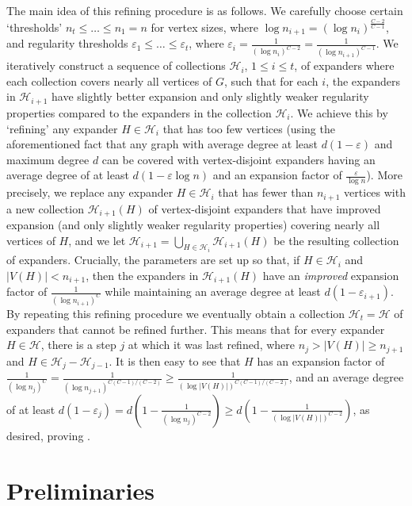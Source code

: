 \documentclass[10pt]{article}
\theoremstyle{plain}
\numberwithin{theorem}{section}
\theoremstyle{definition}
\theoremstyle{remark}
\newcommand{\cH}{\mathcal{H}}
\renewcommand{\setminus}{-}
\newcommand{\eps}{\varepsilon}
\theoremstyle{plain}
\begin{document}
The main idea of this refining procedure is as follows. We carefully choose certain `thresholds' $n_t \leq \dots \leq n_1 = n$ for vertex sizes, where $\log n_{i+1} = (\log n_i)^{\frac{C-2}{C-1}}$, and regularity thresholds $\eps_1 \leq \dots \leq \eps_t$, where $\eps_i = \frac{1}{(\log n_i)^{C-2}} = \frac{1}{(\log n_{i+1})^{C-1}}$. We iteratively construct a sequence of collections $\mathcal{H}_i$, $1 \leq i \leq t$, of expanders where each collection covers nearly all vertices of $G$, such that for each $i$, the expanders in $\mathcal{H}_{i+1}$ have slightly better expansion and only slightly weaker regularity properties compared to the expanders in the collection $\mathcal{H}_i$. We achieve this by `refining' any expander $H \in \mathcal{H}_i$ that has too few vertices (using
the aforementioned fact that any graph with average degree at least $d(1 - \eps)$ and maximum degree $d$ can be covered with vertex-disjoint expanders having an average degree of at least $d(1 - \eps \log n)$ and an expansion factor of $\frac{\eps}{\log n}$). More precisely, we replace any expander $H \in \mathcal{H}_i$ that has fewer than $n_{i+1}$ vertices with a new collection $\mathcal{H}_{i+1}(H)$ of vertex-disjoint expanders that have improved expansion (and only slightly weaker regularity properties) covering nearly all vertices of $H$, and
we let $\mathcal{H}_{i+1} = \bigcup_{H \in \mathcal{H}_i} \mathcal{H}_{i+1}(H)$ be the resulting collection of expanders. 
Crucially, the parameters are set up so that, if $H \in \cH_i$ and $|V(H)| < n_{i+1}$, then the expanders in $\cH_{i+1}(H)$ have an \emph{improved} expansion factor of $\frac{1}{(\log n_{i+1})^C}$ while maintaining an average degree at least $d(1 - \eps_{i+1})$. 
By repeating this refining procedure we eventually obtain a collection $\cH_t = \cH$ of expanders that cannot be refined further. This means that for every expander $H \in \cH$, there is a step $j$ at which it was last refined, where $n_j > |V(H)| \ge n_{j+1}$ and $H \in \cH_j \setminus \cH_{j-1}$. It is then easy to see that $H$ has an expansion factor of $\frac{1}{(\log n_{j})^C} = \frac{1}{(\log n_{j+1})^{C(C-1)/(C-2)}} \ge \frac{1}{(\log |V(H)|)^{C(C-1)/(C-2)}}$, and an average degree of at least $d(1 - \eps_j) = d(1 - \frac{1}{(\log n_j)^{C-2}}) \ge d(1 - \frac{1}{(\log |V(H)|)^{C-2}})$, as desired, proving .    

\section{Preliminaries}
\label{sec:prelim}
\end{document}
